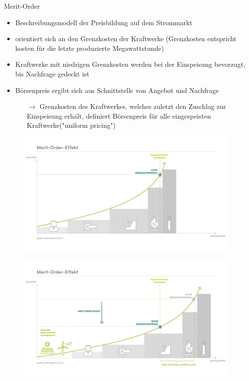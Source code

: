\documentclass[aspectratio=1610, professionalfonts, 9pt]{beamer}
\begin{document}
\begin{frame}{Merit-Order}
\begin{itemize}
  \item Beschreibungsmodell der Preisbildung auf dem Strommarkt
  \item orientiert sich an den Grenzkosten der Kraftwerke
  (Grenzkosten entspricht kosten für die letzte produzierte Megawattstunde)
\item Kraftwerke mit niedrigen Grenzkosten werden bei der
 Einspeisung bevorzugt, bis Nachfrage gedeckt ist
\item Börsenpreis ergibt sich aus Schnittstelle von Angebot und Nachfrage
\begin{itemize}
  \item[$\rightarrow$] Grenzkosten des Kraftwerkes, welches zuletzt den
  Zuschlag zur Einspeisung erhält, definiert Börsenpreis für alle eingespeisten Kraftwerke("uniform pricing")
\end{itemize}
\end{itemize}
\end{frame}

\begin{frame}
  \begin{figure}
  \includegraphics[width=1\textwidth]{images/Meritorder.png}
\end{figure}
\end{frame}


\begin{frame}
  \begin{figure}
  \includegraphics[width=1\textwidth]{images/Merit.png}
\end{figure}
\end{frame}
\end{document}
